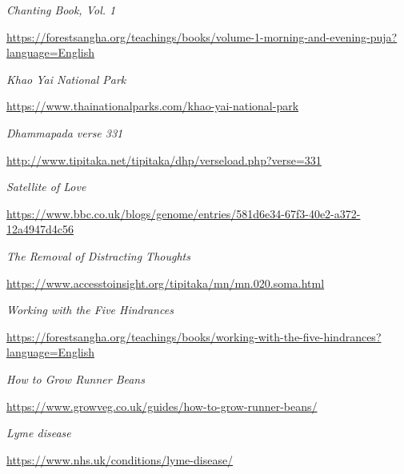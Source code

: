 \begin{thebibliography}{9}
 \emph{Chanting Book, Vol. 1}

  {\urlsize \url{https://forestsangha.org/teachings/books/volume-1-morning-and-evening-puja?language=English}}

 \emph{Khao Yai National Park}

  {\urlsize \url{https://www.thainationalparks.com/khao-yai-national-park}}

 \emph{Dhammapada verse 331}

  {\urlsize \url{http://www.tipitaka.net/tipitaka/dhp/verseload.php?verse=331}}

 \emph{Satellite of Love}

  {\urlsize \url{https://www.bbc.co.uk/blogs/genome/entries/581d6e34-67f3-40e2-a372-12a4947d4c56}}

 \emph{The Removal of Distracting Thoughts}

  {\urlsize \url{https://www.accesstoinsight.org/tipitaka/mn/mn.020.soma.html}}

 \emph{Working with the Five Hindrances}

  {\urlsize \url{https://forestsangha.org/teachings/books/working-with-the-five-hindrances?language=English}}

 \emph{How to Grow Runner Beans}

  {\urlsize \url{https://www.growveg.co.uk/guides/how-to-grow-runner-beans/}}

 \emph{Lyme disease}

  {\urlsize \url{https://www.nhs.uk/conditions/lyme-disease/}}

\end{thebibliography}
